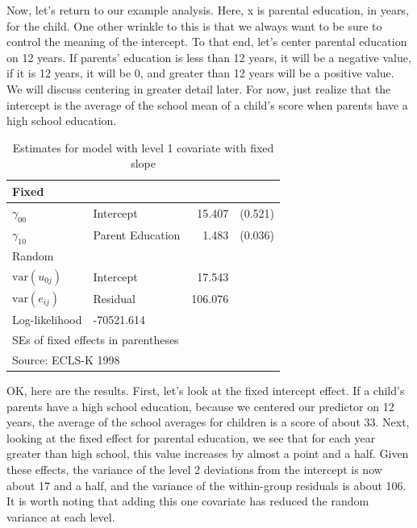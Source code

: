 Now, let's return to our example analysis. Here, x is parental education, in years, for the child. One other wrinkle to this is that we always want to be sure to control the meaning of the intercept.  To that end, let's center parental education on 12 years. If parents' education is less than 12 years, it will be a negative value, if it is 12 years, it will be 0, and greater than 12 years will be a positive value. We will discuss centering in greater detail later. For now, just realize that the intercept is the average of the school mean of a child's score when parents have a high school education.

\begin{table}
  \centering
  \begin{center}
	\begin{tabular}{llrr}
\hline
\multicolumn{4}{l}{Fixed} 			 \\
\hline
$\gamma_{00}$	&	Intercept    	&   15.407 &   (0.521)   \\
$\gamma_{10}$    &	Parent Education    	& 1.483 &   (0.036)    \\
\hline
\multicolumn{4}{l}{Random}	  \\
\hline
	
$\mbox{var}\left(u_{0j}\right)$	&	Intercept    	&   17.543  \\

$\mbox{var}\left(e_{ij}\right)$  		&	Residual	& 	106.076  \\
\hline
Log-likelihood 	&		 -70521.614 \\
\hline
\multicolumn{4}{l}{SEs of fixed effects in parentheses} \\
\multicolumn{4}{l}{Source: ECLS-K 1998} \\
\hline
\end{tabular}
\end{center}
  \caption{Estimates for model with level 1 covariate with fixed slope}\label{ecls2}
\end{table}

OK, here are the results. First, let's look at the fixed intercept effect. If a child's parents have a high school education, because we centered our predictor on 12 years, the average of the school averages for children is a score of about 33. Next, looking at the fixed effect for parental education, we see that for each year greater than high school, this value increases by almost a point and a half. Given these effects, the variance of the level 2 deviations from the intercept is now about 17 and a half, and the variance of the within-group residuals is about 106. It is worth noting that adding this one covariate has reduced the random variance at each level.

